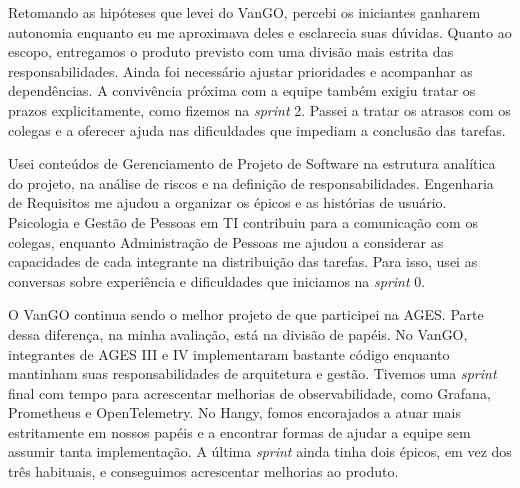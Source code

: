 Retomando as hipóteses que levei do VanGO, percebi os iniciantes ganharem
autonomia enquanto eu me aproximava deles e esclarecia suas dúvidas. Quanto ao
escopo, entregamos
o produto previsto com uma divisão mais estrita das responsabilidades.
Ainda foi necessário ajustar prioridades e acompanhar as dependências.
A convivência próxima com a equipe também exigiu tratar os prazos
explicitamente, como fizemos na \textit{sprint} 2. Passei a tratar os atrasos com os colegas e a oferecer ajuda nas
dificuldades que impediam a conclusão das tarefas.

Usei conteúdos de Gerenciamento de Projeto de Software na estrutura
analítica do projeto, na análise de riscos e na definição de
responsabilidades. Engenharia de Requisitos me ajudou a organizar os épicos
e as histórias de usuário. Psicologia e Gestão de Pessoas em TI contribuiu
para a comunicação com os colegas, enquanto Administração de Pessoas me
ajudou a considerar as capacidades de cada integrante na distribuição das
tarefas. Para isso, usei as conversas sobre experiência e dificuldades que
iniciamos na \textit{sprint} 0.

O VanGO continua sendo o melhor projeto de que participei na AGES. Parte
dessa diferença, na minha avaliação, está na divisão de papéis. No VanGO,
integrantes de AGES III e IV implementaram bastante código enquanto
mantinham suas responsabilidades de arquitetura e gestão. Tivemos uma
\textit{sprint} final com tempo para acrescentar melhorias de observabilidade,
como Grafana, Prometheus e OpenTelemetry. No Hangy, fomos encorajados a atuar
mais estritamente em nossos papéis e a encontrar formas de ajudar a equipe
sem assumir tanta implementação. A última \textit{sprint} ainda tinha dois
épicos, em vez dos três habituais, e conseguimos acrescentar melhorias ao
produto.
